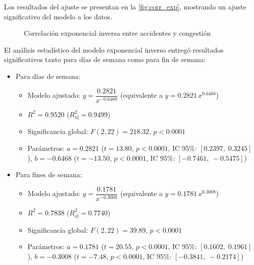 \documentclass[12pt]{article}
\begin{document}
Los resultados del ajuste se presentan en la \autoref{fig:corr_exp}, mostrando un ajuste significativo del modelo a los datos.

\begin{figure}[H]
    \centering
    \newline
    \newline
    \caption{Correlación exponencial inversa entre accidentes y congestión}
    \label{fig:corr_exp}
\end{figure}

El análisis estadístico del modelo exponencial inverso entregó resultados significativos tanto para días de semana como para fin de semana:

\begin{itemize}
    \item Para días de semana:
    \begin{itemize}
        \item Modelo ajustado: $y = \dfrac{0.2821}{x^{-0.6468}}$ \; (equivalente a $y = 0.2821\,x^{0.6468}$)
        \item $R^2 = 0.9520$ \; ($R^2_{\text{aj}} = 0.9499$)
        \item Significancia global: $F(2, 22) = 218.32$, $p < 0.0001$
        \item Parámetros:
              $a=0.2821$ \; ($t = 13.80$, $p < 0.0001$, IC 95\%: $[0.2397,\;0.3245]$), \;
              $b=-0.6468$ \; ($t = -13.50$, $p < 0.0001$, IC 95\%: $[-0.7461,\;-0.5475]$)
    \end{itemize}

    \item Para fines de semana:
    \begin{itemize}
        \item Modelo ajustado: $y = \dfrac{0.1781}{x^{-0.3008}}$ \; (equivalente a $y = 0.1781\,x^{0.3008}$)
        \item $R^2 = 0.7838$ \; ($R^2_{\text{aj}} = 0.7740$)
        \item Significancia global: $F(2, 22) = 39.89$, $p < 0.0001$
        \item Parámetros:
              $a=0.1781$ \; ($t = 20.55$, $p < 0.0001$, IC 95\%: $[0.1602,\;0.1961]$), \;
              $b=-0.3008$ \; ($t = -7.48$, $p < 0.0001$, IC 95\%: $[-0.3841,\;-0.2174]$)
    \end{itemize}
\end{itemize}
\end{document}
